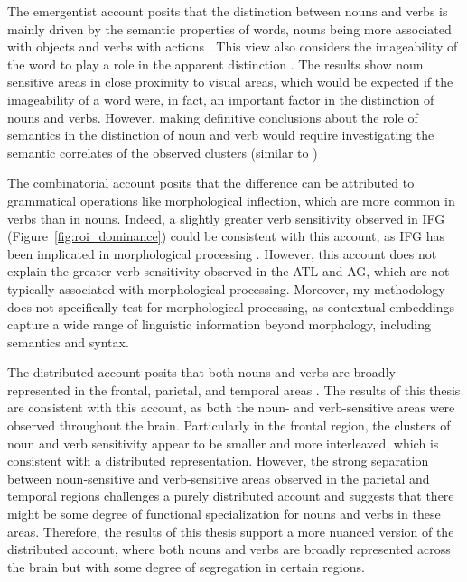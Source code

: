 \documentclass[a4paper]{article}
\begin{document}
The emergentist account posits that the distinction between nouns and verbs is mainly driven by the semantic properties of words, nouns being more associated with objects and verbs with actions \parencite{vigliocco_nouns_2011}. This view also considers the imageability of the word to play a role in the apparent distinction \parencite{bird_why_2000}. The results show noun sensitive areas in close proximity to visual areas, which would be expected if the imageability of a word were, in fact, an important factor in the distinction of nouns and verbs. However, making definitive conclusions about the role of semantics in the distinction of noun and verb would require investigating the semantic correlates of the observed clusters (similar to \textcite{huth_natural_2016})

The combinatorial account posits that the difference can be attributed to grammatical operations like morphological inflection, which are more common in verbs than in nouns. Indeed, a slightly greater verb sensitivity observed in IFG (Figure~\ref{fig:roi_dominance}) could be consistent with this account, as IFG has been implicated in morphological processing \parencite{siri_neural_2007, yokoyama_cortical_2006,tyler_neural_2004}. However, this account does not explain the greater verb sensitivity observed in the ATL and AG, which are not typically associated with morphological processing. Moreover, my methodology does not specifically test for morphological processing, as contextual embeddings capture a wide range of linguistic information beyond morphology, including semantics and syntax. 

The distributed account posits that both nouns and verbs are broadly represented in the frontal, parietal, and temporal areas \parencite{crepaldi_clustering_2013}. The results of this thesis are consistent with this account, as both the noun- and verb-sensitive areas were observed throughout the brain. Particularly in the frontal region, the clusters of noun and verb sensitivity appear to be smaller and more interleaved, which is consistent with a distributed representation. However, the strong separation between noun-sensitive and verb-sensitive areas observed in the parietal and temporal regions challenges a purely distributed account and suggests that there might be some degree of functional specialization for nouns and verbs in these areas. Therefore, the results of this thesis support a more nuanced version of the distributed account, where both nouns and verbs are broadly represented across the brain but with some degree of segregation in certain regions.
\end{document}

